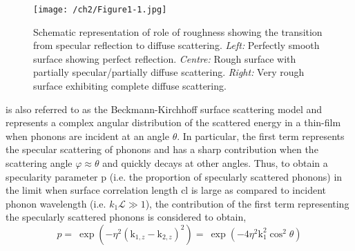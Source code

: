 \begin{figure}[hbt]
	\centering \texttt{[image: /ch2/Figure1-1.jpg]}
	\caption{Schematic representation of role of roughness showing the transition from specular reflection to diffuse
scattering. \textit{Left:} Perfectly smooth surface showing perfect reflection. \textit{Centre:} Rough surface with partially
specular/partially diffuse scattering. \textit{Right:} Very rough surface exhibiting complete diffuse scattering.}
	\label{fig:ch2-bk_schematic1}
\end{figure}
 is also referred to as the Beckmann-Kirchhoff surface scattering model and represents a complex angular distribution of the scattered energy in a thin-film when phonons are incident at an angle $\theta$. In particular, the first term represents the specular scattering of phonons and has a sharp contribution when the scattering angle $\varphi\approx \theta$ and quickly decays at other angles. Thus, to obtain a specularity parameter \gls{p} (i.e. the proportion of specularly scattered phonons) in the limit when surface correlation length \gls{cl} is large as compared to incident phonon wavelength (i.e. $k_1\mathcal{L}\gg1$), the contribution of the first term representing the specularly scattered phonons is considered to obtain,
\begin{equation}
p=\ \exp(-\eta^2(\mathrm{k}_{1,z}-\mathrm{k}_{2,z})^2)=\ \exp(-4\eta^2\mathrm{k}_1^2\cos^2{\theta})                                     
\end{equation}

